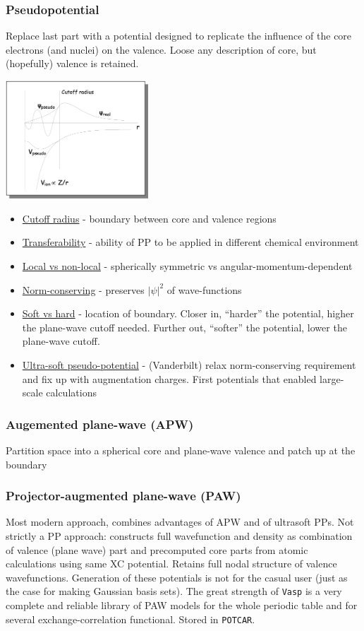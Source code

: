 \documentclass[11pt]{article}
\begin{document}
\subsubsection{Pseudopotential}
\label{sec:org8ae297d}
Replace last part with a potential designed to replicate the influence of the core electrons (and nuclei) on the valence.  Loose any description of core, but (hopefully) valence is retained.

\begin{center}
\includegraphics[width=0.4\textwidth]{./Images/PP.png}
\end{center}

\begin{itemize}
\item \uline{Cutoff radius} - boundary between core and valence regions
\item \uline{Transferability} - ability of PP to be applied in different chemical environment
\item \uline{Local vs non-local} - spherically symmetric vs angular-momentum-dependent
\item \uline{Norm-conserving} - preserves \(|\psi|^2\) of wave-functions
\item \uline{Soft vs hard} - location of boundary. Closer in, ``harder'' the potential, higher the plane-wave cutoff needed.  Further out, ``softer'' the potential, lower the plane-wave cutoff.
\item \uline{Ultra-soft pseudo-potential} - (Vanderbilt)  relax norm-conserving requirement and fix up with augmentation charges. First potentials that enabled large-scale calculations
\end{itemize}
\subsubsection{Augemented plane-wave (APW)}
\label{sec:org9860ac5}
Partition space into a spherical core and plane-wave valence and patch up at the boundary
\subsubsection{Projector-augmented plane-wave (PAW)}
\label{sec:orgb7b2c6a}
Most modern approach, combines advantages of APW and of ultrasoft
PPs. Not strictly a PP approach: constructs full wavefunction and
density as combination of valence (plane wave) part and precomputed
core parts from atomic calculations using same XC potential. Retains
full nodal structure of valence wavefunctions.  Generation of these
potentials is not for the casual user (just as the case for making
Gaussian basis sets). The great strength of \texttt{Vasp} is a very complete
and reliable library of PAW models for the whole periodic table and
for several exchange-correlation functional. Stored in \texttt{POTCAR}.
\end{document}
